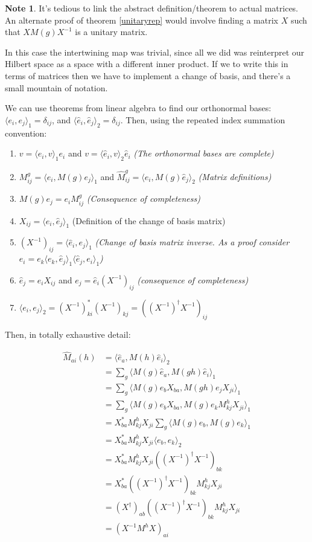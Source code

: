 \documentclass[12pt, letterpaper]{article}
\theoremstyle{definition} %
\newtheorem{note}[thm]{Note}
\begin{document}
\begin{note}
  It's tedious to link the abstract definition/theorem to actual matrices. An
  alternate proof of theorem \ref{unitaryrep} would involve finding a matrix $X$ such
  that $X M(g) X^{-1}$ is a unitary matrix.

  In this case the intertwining map was trivial, since all we did was reinterpret our Hilbert space as a space with a different inner product.
  If we to write this in terms of matrices then we have to implement a change of basis, and there's a small mountain of notation.

  We can use theorems from linear algebra to find our orthonormal bases: $\langle e_i,e_j\rangle_1=\delta_{ij}$, 
  and $\langle \hat{e}_i,\hat{e}_j\rangle_2=\delta_{ij}$. Then, using the repeated index summation convention:
  
  \begin{enumerate}
    \item $v=\langle e_i,v\rangle_1 e_i$ and $v=\langle \hat{e}_i,v\rangle_2 \hat{e}_i$ \emph{(The orthonormal bases are complete)}
    \item $M_{ij}^g=\langle e_i,M(g) e_j\rangle_1$ and $\hat{M}^g_{ij}=\langle \hat{e}_i,M(g)\hat{e}_j\rangle_2$ \emph{(Matrix definitions)}
    \item $M(g) e_j=e_i M_{ij}^g$ \emph{(Consequence of completeness)}
    \item $X_{ij}=\langle e_i,\hat{e}_j\rangle_1$ (Definition of the change of basis matrix)
    \item $(X^{-1})_{ij}=\langle \hat{e}_i,e_j\rangle_1$ \emph{(Change of basis matrix inverse. As a proof consider $e_i=e_k\langle e_k,\hat{e}_j\rangle_1\langle \hat{e}_j,e_i\rangle_1$)}
    \item $\hat{e}_j=e_i X_{ij}$ and $e_j=\hat{e}_i (X^{-1})_{ij}$ \emph{(consequence of completeness)}
    \item $\langle e_i,e_j\rangle_2=(X^{-1})_{ki}^* (X^{-1})_{kj}=((X^{-1})^\dagger X^{-1})_{ij}$
  \end{enumerate}

  Then, in totally exhaustive detail:

  \begin{align*}
    \hat{M}_{ai}(h)&=\langle \hat{e}_a, M(h)\hat{e}_i\rangle_2\\
    &=\sum_g\langle M(g)\hat{e}_a,M(gh)\hat{e}_i\rangle_1\\
    &=\sum_g\langle M(g)e_b X_{ba},M(gh)e_j X_{ji}\rangle_1\\
    &=\sum_g\langle M(g)e_b X_{ba},M(g)e_kM^h_{kj} X_{ji}\rangle_1\\
    &=X_{ba}^*M^h_{kj}X_{ji}\sum_g\langle M(g)e_b,M(g)e_k\rangle_1\\
    &=X_{ba}^*M^h_{kj}X_{ji}\langle e_b,e_k\rangle_2 \\
    &=X_{ba}^*M^h_{kj}X_{ji}((X^{-1})^\dagger X^{-1})_{bk} \\
    &=X_{ba}^*((X^{-1})^\dagger X^{-1})_{bk}M^h_{kj}X_{ji} \\
    &=(X^\dagger)_{ab}((X^{-1})^\dagger X^{-1})_{bk}M^h_{kj}X_{ji} \\
    &=(X^{-1}M^hX)_{ai}
  \end{align*}
\end{note}
\end{document}
